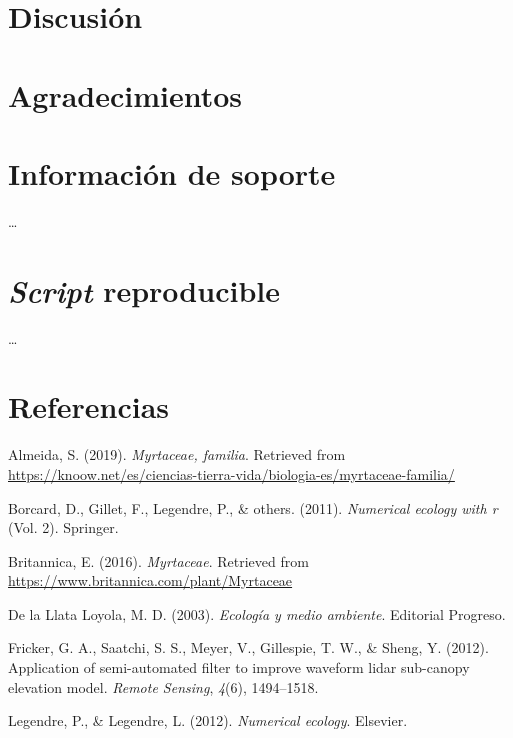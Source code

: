 \documentclass[11pt,]{article}
\begin{document}
\section{Discusión}\label{discusiuxf3n}

\section{Agradecimientos}\label{agradecimientos}

\section{Información de soporte}\label{informaciuxf3n-de-soporte}

\ldots

\section{\texorpdfstring{\emph{Script}
reproducible}{Script reproducible}}\label{script-reproducible}

\ldots

\section*{Referencias}\label{referencias}

\hypertarget{refs}{}
\hypertarget{ref-sandra2019myrtaceae}{}
Almeida, S. (2019). \emph{Myrtaceae, familia}. Retrieved from
\url{https://knoow.net/es/ciencias-tierra-vida/biologia-es/myrtaceae-familia/}

\hypertarget{ref-borcard2011numerical}{}
Borcard, D., Gillet, F., Legendre, P., \& others. (2011).
\emph{Numerical ecology with r} (Vol. 2). Springer.

\hypertarget{ref-encymyrtaceae}{}
Britannica, E. (2016). \emph{Myrtaceae}. Retrieved from
\url{https://www.britannica.com/plant/Myrtaceae}

\hypertarget{ref-de2003ecologia}{}
De la Llata Loyola, M. D. (2003). \emph{Ecología y medio ambiente}.
Editorial Progreso.

\hypertarget{ref-fricker2012application}{}
Fricker, G. A., Saatchi, S. S., Meyer, V., Gillespie, T. W., \& Sheng,
Y. (2012). Application of semi-automated filter to improve waveform
lidar sub-canopy elevation model. \emph{Remote Sensing}, \emph{4}(6),
1494--1518.

\hypertarget{ref-legendre2012numerical}{}
Legendre, P., \& Legendre, L. (2012). \emph{Numerical ecology}.
Elsevier.
\end{document}
